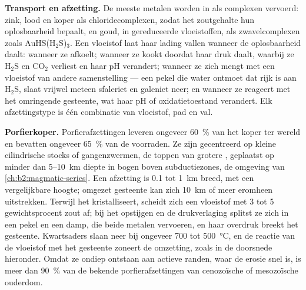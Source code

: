 \textbf{Transport en afzetting.} De meeste metalen worden in  als complexen vervoerd:
zink, lood en koper als chloridecomplexen, zodat het zoutgehalte hun oplosbaarheid bepaalt, en goud,
in gereduceerde vloeistoffen, als zwavelcomplexen zoals AuHS(H$_2$S)$_3$. Een vloeistof laat haar lading vallen wanneer de
oplosbaarheid daalt: wanneer ze afkoelt; wanneer ze kookt doordat haar druk daalt, waarbij ze H$_2$S en CO$_2$ verliest en
haar pH verandert; wanneer ze zich mengt met een vloeistof van andere samenstelling --- een pekel die water ontmoet dat rijk is
aan H$_2$S, slaat vrijwel meteen sfaleriet en galeniet neer; en wanneer ze reageert met het omringende
gesteente, wat haar pH of oxidatietoestand verandert. Elk afzettingstype is één combinatie van vloeistof,
pad en val.

\textbf{Porfierkoper.} Porfierafzettingen leveren ongeveer \qty{60}{\percent} van het koper ter wereld
en bevatten ongeveer \qty{65}{\percent} van de voorraden. Ze zijn gecentreerd op kleine cilindrische
stocks of gangenzwermen, de toppen van grotere , geplaatst op minder dan 5--\qty{10}{km} diepte in
bogen boven subductiezones, de omgeving van \cref{ch:b2:magmatic-series}. Een afzetting is 0.1 tot
\qty{1}{km} breed, met een vergelijkbare hoogte; omgezet gesteente kan zich \qty{10}{km} of meer eromheen uitstrekken.
Terwijl het  kristalliseert, scheidt zich een vloeistof met 3 tot 5 gewichtsprocent zout af; bij het opstijgen en
de drukverlaging splitst ze zich in een pekel en een damp, die beide metalen vervoeren, en haar overdruk
breekt het gesteente. Kwartsaders slaan neer bij ongeveer 700 tot \qty{500}{\celsius}, en de
reactie van de vloeistof met het gesteente zoneert de omzetting, zoals in de doorsnede hieronder. Omdat ze
ondiep ontstaan aan actieve randen, waar de erosie snel is, is meer dan \qty{90}{\percent} van de bekende
porfierafzettingen van cenozoïsche of mesozoïsche ouderdom.

